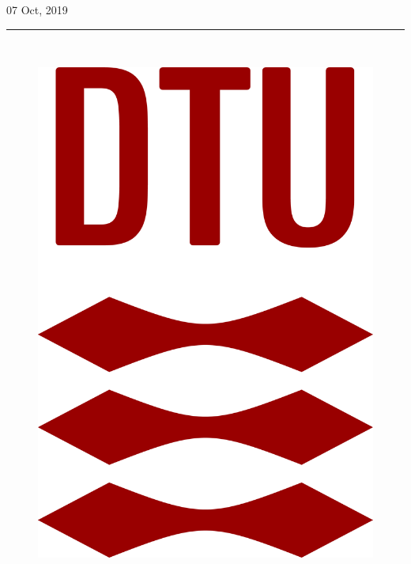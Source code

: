 \begin{titlepage}


\vspace{40pt}
{\large 07 Oct, 2019}\\[2.2cm] %
\rule{.7\linewidth}{0.5mm}
\\[.7cm]

\begin{figure}[H]
\centering
\includegraphics[width = .4\textwidth]{fig/logo.png}
\end{figure}


\vfill %
\end{titlepage}
\newpage

